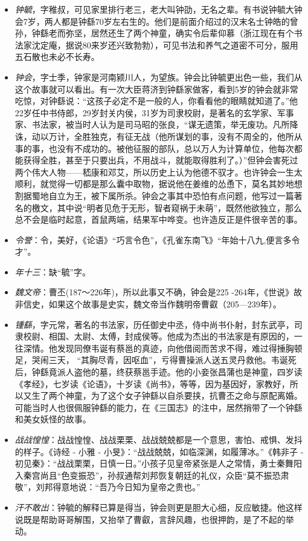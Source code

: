 \documentclass[]{book}
\providecommand{\tightlist}{%
  \setlength{\itemsep}{0pt}\setlength{\parskip}{0pt}}
\begin{document}
\begin{itemize}
\tightlist
\item
  \emph{钟毓}，字稚叔，可见家里排行老三，老大叫钟劭，无名之辈。有书说钟毓大钟会7岁，两人都是钟繇70岁左右生的。他们是前面介绍过的汉末名士钟皓的曾孙，钟繇老而弥坚，居然还生了两个神童，确实令后辈仰慕（浙江现在有个书法家沈定庵，据说80来岁还兴致勃勃），可见书法和养气之道密不可分，服用五石散也未必不长寿。
\item
  \emph{钟会}，字士季，钟家是河南颍川人，为望族。钟会比钟毓更出色一些，我们从这个故事就可以看出。有一次大臣蒋济到钟繇家做客，看到5岁的钟会就非常吃惊，对钟繇说：``这孩子必定不是一般的人，你看看他的眼睛就知道了。''他22岁任中书侍郎，29岁封关内侯，31岁为司隶校尉，是著名的玄学家、军事家、书法家，被当时人认为是司马昭的张良，``谋无遗策，举无废功。凡所降诛，动以万计，全胜独克，有征无战（他所谋划的事，没有不周全的，他所从事的事，也没有不成功的。被他征服的部队，总以万人为计算单位，他每次都能获得全胜，甚至于只要出兵，不用战斗，就能取得胜利了。）''但钟会害死过两个伟大人物------嵇康和邓艾，所以历史上认为他德不驭才。也许钟会一生太顺利，就觉得一切都是那么囊中取物，据说他在姜维的怂恿下，莫名其妙地想割据蜀地自立为王，被下属所杀。钟会之事其中恐怕有点问题，他写过一篇著名的檄文，其中说``明者见危于无形，智者窥祸于未萌''，既然他欲独立，那么总不会是临时起意，首鼠两端，结果军中哗变。也许造反正是件很辛苦的事。
\item
  \emph{令誉}：令，美好，《论语》``巧言令色''，《孔雀东南飞》``年始十八九,便言多令才''。
\item
  \emph{年十三}：缺``毓''字。
\item
  \emph{魏文帝}：曹丕(187～226年)，所以此事又不确，钟会是225
  -264年，《世说》故非信史，如果这个故事是史实，魏文帝当作魏明帝曹叡（205---239年）。
\item
  \emph{锺繇}，字元常，著名的书法家，历任御史中丞，侍中尚书仆射，封东武亭，司隶校尉、相国、太尉、太傅，封成侯等。他成为杰出的书法家是有原因的，一往深情。他发现同僚韦诞有蔡邕的真迹，向他借阅而苦求不得，难过得捶胸顿足，哭闹三天，
  ``其胸尽青，因呕血''，亏得曹操派人送五灵丹救他。韦诞死后，钟繇竟派人盗他的墓，终获蔡邕手迹。他的小妾张昌蒲也是神童，四岁读《孝经》，七岁读《论语》，十岁读《尚书》，等等，因为基因好，家教好，所以又生了两个神童，为了这个女子钟繇以自杀要挟，抗曹丕之命与原配离婚。可能当时人也很佩服钟繇的能力，在《三国志》的注中，居然捎带了一个钟繇和美女妖怪的故事。
\item
  \emph{战战惶惶}：战战惶惶、战战栗栗、战战兢兢都是一个意思，害怕、戒惧、发抖的样子。《诗经
  - 小雅 - 小旻》：``战战兢兢，如临深渊，如履薄冰。''《韩非子 -
  初见秦》：``战战栗栗，日慎一日。''小孩子见皇帝紧张是人之常情，勇士秦舞阳入秦宫尚且``色变振恐''，孙叔通帮刘邦恢复朝廷的礼仪，众臣``莫不振恐肃敬''，刘邦得意地说：``吾乃今日知为皇帝之贵也。''
\item
  \emph{汗不敢出}：钟毓的解释已算是得当，钟会则更是胆大心细，反应敏捷。他这样说既是帮助哥哥解围，又抬举了曹叡，言辞风趣，也很押韵，是了不起的举动。
\end{itemize}
\end{document}
